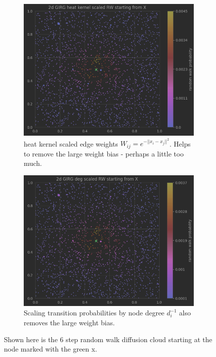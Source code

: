 \begin{figure}
  \vspace{1em}

  \begin{subfigure}{0.49\textwidth}
    \centering
    \includegraphics[width=\linewidth]{figures/2d_GIRG_heatkernelscaled_RW.png}
    \caption{heat kernel scaled edge weights $W_{ij} = e^{-||x_i - x_j||^2}$. Helps to remove the large weight bias - perhaps a little too much.}
  \end{subfigure}
  \hfill
  \begin{subfigure}{0.49\textwidth}
    \centering
    \includegraphics[width=\linewidth]{figures/2d_GIRG_degscaled_RW.png}
    \caption{Scaling transition probabilities by node degree $d_i^{-1}$  also removes the large weight bias.}
    \label{fig:diffmap_algo_comparisons_degscaled}
  \end{subfigure}
  \label{fig:diffmap_algo_comparisons}
  \caption{Shown here is the 6 step random walk diffusion cloud starting at the node marked with the green x.}
\end{figure}




